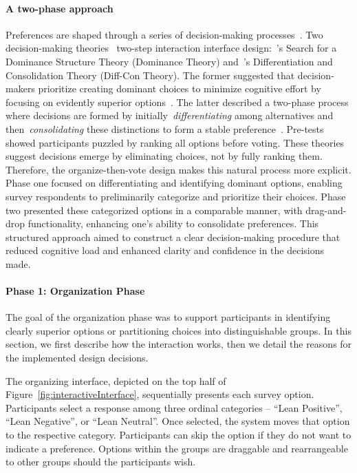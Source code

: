 \paragraph{A two-phase approach}
Preferences are shaped through a series of decision-making processes~\cite{lichtensteinConstructionPreference2006}. Two decision-making theories~ two-step interaction interface design:~\citet{montgomeryDecisionRulesSearch1983}'s Search for a Dominance Structure Theory (Dominance Theory) and~\citet{svensonDifferentiationConsolidationTheory1992}'s Differentiation and Consolidation Theory (Diff-Con Theory). The former suggested that decision-makers prioritize creating dominant choices to minimize cognitive effort by focusing on evidently superior options~\cite{montgomeryDecisionRulesSearch1983}. The latter described a two-phase process where decisions are formed by initially~\textit{differentiating} among alternatives and then~\textit{consolidating} these distinctions to form a stable preference~\cite{svensonDifferentiationConsolidationTheory1992}. Pre-tests showed participants puzzled by ranking all options before voting. These theories suggest decisions emerge by eliminating choices, not by fully ranking them. Therefore, the organize-then-vote design makes this natural process more explicit. Phase one focused on differentiating and identifying dominant options, enabling survey respondents to preliminarily categorize and prioritize their choices. Phase two presented these categorized options in a comparable manner, with drag-and-drop functionality, enhancing one's ability to consolidate preferences. This structured approach aimed to construct a clear decision-making procedure that reduced cognitive load and enhanced clarity and confidence in the decisions made.

\paragraph{Phase 1: Organization Phase}
The goal of the organization phase was to support participants in identifying clearly superior options or partitioning choices into distinguishable groups. In this section, we first describe how the interaction works, then we detail the reasons for the implemented design decisions.

The organizing interface, depicted on the top half of Figure~\ref{fig:interactiveInterface}, sequentially presents each survey option. Participants select a response among three ordinal categories -- ``Lean Positive'', ``Lean Negative'', or ``Lean Neutral''. Once selected, the system moves that option to the respective category. Participants can skip the option if they do not want to indicate a preference. Options within the groups are draggable and rearrangeable to other groups should the participants wish.

